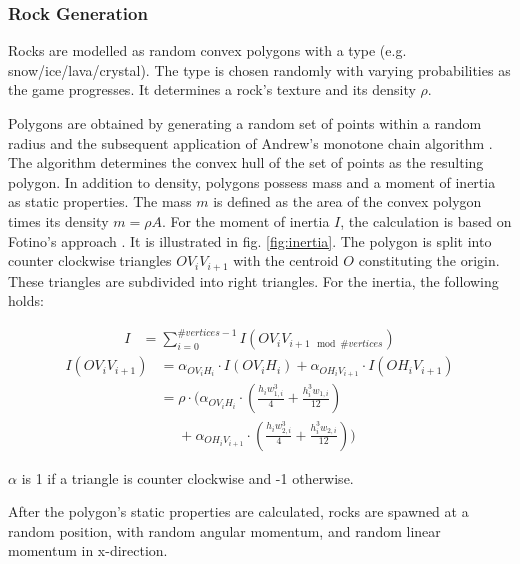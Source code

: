 \subsubsection{Rock Generation}

Rocks are modelled as random convex polygons with a type (e.g. snow/ice/lava/crystal).
The type is chosen randomly with varying probabilities as the game progresses.
It determines a rock's texture and its density $\rho$.

Polygons are obtained by generating a random set of points within a random radius and the subsequent application of Andrew's monotone chain algorithm \cite{polygon_generation}. 
The algorithm determines the convex hull of the set of points as the resulting polygon.
In addition to density, polygons possess mass and a moment of inertia as static properties.
The mass $m$ is defined as the area of the convex polygon times its density $m = \rho A$.
For the moment of inertia $I$, the calculation is based on Fotino's approach \cite{inertia}.
It is illustrated in fig. \ref{fig:inertia}.
The polygon is split into counter clockwise triangles $OV_iV_{i+1}$ with the centroid $O$ constituting the origin.
These triangles are subdivided into right triangles. For the inertia, the following holds:

\vspace{-\abovedisplayskip}
\begin{align}
  I &= \sum_{i=0}^{\#vertices-1} I(OV_{i}V_{i+1 \mod \#vertices})
\end{align}
\begin{align}  
  I(OV_{i}V_{i+1}) &= \alpha_{OV_{i}H_i}\cdot I(OV_{i}H_i) + \alpha_{OH_iV_{i+1}}\cdot I(OH_iV_{i+1}) \nonumber\\
  &= \rho \cdot \Bigg(\alpha_{OV_{i}H_i}\cdot \left(\frac{h_iw_{1,i}^3}{4} + \frac{h_i^3w_{1,i}}{12}\right) \nonumber\\
  &\phantom{= }+ \alpha_{OH_iV_{i+1}}\cdot \left(\frac{h_iw_{2,i}^3}{4} + \frac{h_i^3w_{2,i}}{12}\right)\Bigg)
\end{align}

\noindent $\alpha$ is 1 if a triangle is counter clockwise and -1 otherwise.

After the polygon's static properties are calculated, rocks are spawned at a random position, with random angular momentum, and random linear momentum in x-direction.


